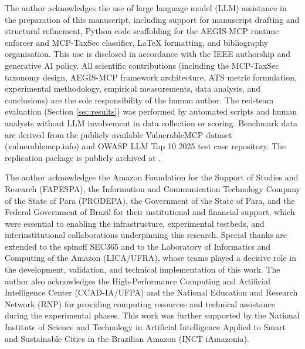 \documentclass[12pt,twocolumn,journal]{IEEEtran}
\begin{document}
The author acknowledges the use of large language model (LLM) assistance in the preparation of this manuscript, including support for manuscript drafting and structural refinement, Python code scaffolding for the AEGIS-MCP runtime enforcer and MCP-TaxSec classifier, LaTeX formatting, and bibliography organisation. This use is disclosed in accordance with the IEEE authorship and generative AI policy. All scientific contributions (including the MCP-TaxSec taxonomy design, AEGIS-MCP framework architecture, ATS metric formulation, experimental methodology, empirical measurements, data analysis, and conclusions) are the sole responsibility of the human author. The red-team evaluation (Section \ref{sec:results}) was performed by automated scripts and human analysts without LLM involvement in data collection or scoring. Benchmark data are derived from the publicly available VulnerableMCP dataset (vulnerablemcp.info) and OWASP LLM Top 10 2025 test case repository. The replication package is publicly archived at \cite{Costa2026Repo}.

The author acknowledges the Amazon Foundation for the Support of Studies and Research (FAPESPA), the Information and Communication Technology Company of the State of Para (PRODEPA), the Government of the State of Para, and the Federal Government of Brazil for their institutional and financial support, which were essential to enabling the infrastructure, experimental testbeds, and interinstitutional collaborations underpinning this research. Special thanks are extended to the spinoff SEC365 and to the Laboratory of Informatics and Computing of the Amazon (LICA/UFRA), whose teams played a decisive role in the development, validation, and technical implementation of this work. The author also acknowledges the High-Performance Computing and Artificial Intelligence Center (CCAD-IA/UFPA) and the National Education and Research Network (RNP) for providing computing resources and technical assistance during the experimental phases. This work was further supported by the National Institute of Science and Technology in Artificial Intelligence Applied to Smart and Sustainable Cities in the Brazilian Amazon (INCT iAmazonia).
\end{document}
